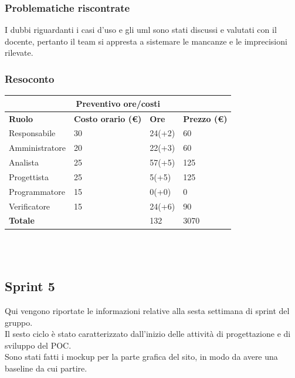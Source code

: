 \documentclass[10pt]{article}
\begin{document}
\subsubsection{Problematiche riscontrate}
I dubbi riguardanti i casi d'uso e gli uml sono stati discussi e valutati con il docente, pertanto il team si appresta a sistemare le mancanze e le imprecisioni rilevate.
\subsubsection{Resoconto}
\begin{center}
	\begin{tabularx}{\textwidth}{|X|X|X|X|}
		\hline
		\multicolumn{4}{|c|}{\textbf{Preventivo ore/costi}}                                      \\
		\hline
		\hline
		\textbf{Ruolo}  & \textbf{Costo orario (\euro)} & \textbf{Ore} & \textbf{Prezzo (\euro)} \\
		\hline
		Responsabile    & 30                            & 24(+2)       & 60                      \\
		\hline
		Amministratore  & 20                            & 22(+3)       & 60                      \\
		\hline
		Analista        & 25                            & 57(+5)       & 125                     \\
		\hline
		Progettista     & 25                            & 5(+5)        & 125                     \\
		\hline
		Programmatore   & 15                            & 0(+0)        & 0                       \\
		\hline
		Verificatore    & 15                            & 24(+6)       & 90                      \\
		\hline
		\hline
		\textbf{Totale} &                               & 132          & 3070                    \\
		\hline
	\end{tabularx}\\[8pt]
	\mbox{}\\
\end{center}

\subsection{Sprint 5}
Qui vengono riportate le informazioni relative alla sesta settimana di sprint del gruppo. \\
Il sesto ciclo è stato caratterizzato dall'inizio delle attività di progettazione e di sviluppo del POC. \\
Sono stati fatti i mockup per la parte grafica del sito, in modo da avere una baseline da cui partire.
\end{document}
